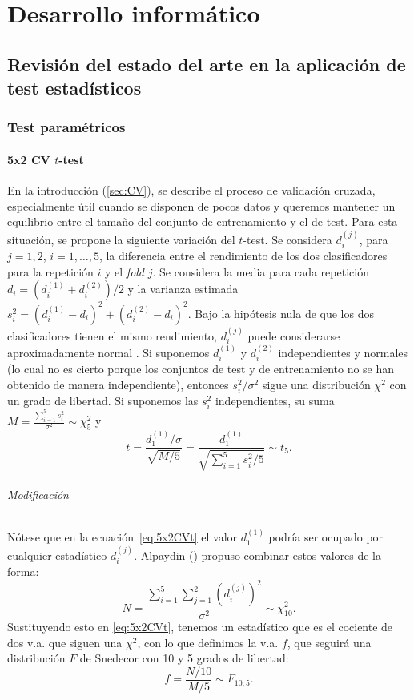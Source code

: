 \part{Desarrollo informático}
\label{part:informatica}

\chapter{Revisión del estado del arte en la aplicación de test estadísticos}
\label{chapter:revision}
\section{Test paramétricos}

\subsection{5x2 CV $t$-test}
	
	En la introducción (\ref{sec:CV}), se describe el 
proceso de validación cruzada, especialmente útil cuando se
disponen de pocos datos y queremos mantener un equilibrio
entre el tamaño del conjunto de entrenamiento y el de test.
Para esta situación, se propone la siguiente variación 
del $t$-test. Se considera $d_i^{(j)}$, para $j=1,2$, $i=
1,\dots,5$, la diferencia entre el rendimiento de los dos
clasificadores para la repetición $i$ y el \textit{fold} $j$.
Se considera la media para cada repetición $\bar{d}_i = 
(d_i^{(1)} + d_i^{(2)})/2$ y la varianza estimada
$s_i^2 = (d_i^{(1)}-\bar{d_i})^2 + (d_i^{(2)}-\bar{d_i})^2$. 
Bajo la hipótesis nula de que los dos clasificadores tienen 
el mismo rendimiento, $d_i^{(j)}$ puede considerarse 
aproximadamente normal . Si suponemos $d_i^{(1)}$ y 
$d_i^{(2)}$ independientes y normales (lo cual no es
cierto porque los conjuntos de test y de entrenamiento
no se han obtenido de manera independiente), entonces
$s_i^2/\sigma^2$ sigue una distribución $\chi^2$ con un
grado de libertad. Si suponemos las $s_i^2$ independientes,
su suma $M = \frac{\sum\limits_{i=1}^5 s_i^2}{\sigma^2}
\sim \chi^2_5$ y 
\begin{equation}
	\label{eq:5x2CVt}
	t = \frac{d_1^{(1)}/\sigma}{\sqrt{M/5}} = 
		\frac{d_1^{(1)}}
			{\sqrt{\sum\limits_{i=1}^5 s_i^2/5}}
		\sim t_5.
\end{equation}

\paragraph{Modificación} Nótese que en la 
ecuación~\ref{eq:5x2CVt} el valor $d_1^{(1)}$ podría ser
ocupado por cualquier estadístico $d_i^{(j)}$. Alpaydin (\cite{Alpaydin98combined5})
propuso combinar estos valores de la forma:
	\[
		N = \frac{\sum\limits_{i=1}^5
				\sum\limits_{j=1}^2
					\left( d_i^{(j)} \right)^2}
				{\sigma^2}
			\sim \chi_{10}^2.
	\]
	Sustituyendo esto en \ref{eq:5x2CVt}, tenemos
un estadístico que es el cociente de dos v.a. que siguen 
una $\chi^2$, con lo que definimos la v.a. $f$, que seguirá
una distribución $F$ de Snedecor con 10 y 5 grados de
libertad:
	\[ 
		f = \frac{N/10}{M/5} \sim F_{10,5}.
	\]
	
